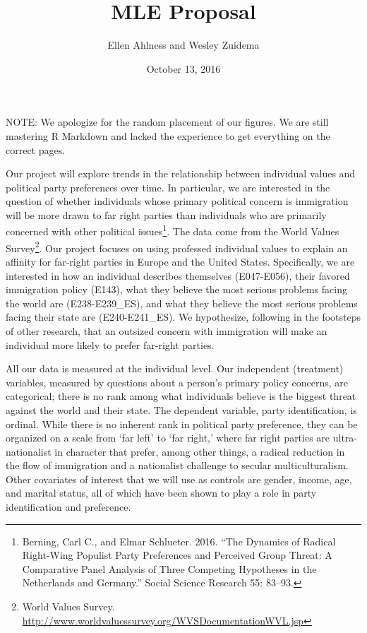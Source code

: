 \documentclass[11pt,]{article}
\title{MLE Proposal}
\author{Ellen Ahlness and Wesley Zuidema}
\date{October 13, 2016}
\let\rmarkdownfootnote\footnote%
\def\footnote{\protect\rmarkdownfootnote}
\begin{document}
\maketitle

NOTE: We apologize for the random placement of our figures. We are still
mastering R Markdown and lacked the experience to get everything on the
correct pages.

Our project will explore trends in the relationship between individual
values and political party preferences over time. In particular, we are
interested in the question of whether individuals whose primary
political concern is immigration will be more drawn to far right parties
than individuals who are primarily concerned with other political
issues\footnote{Berning, Carl C., and Elmar Schlueter. 2016. ``The
  Dynamics of Radical Right-Wing Populist Party Preferences and
  Perceived Group Threat: A Comparative Panel Analysis of Three
  Competing Hypotheses in the Netherlands and Germany.'' Social Science
  Research 55: 83--93.}. The data come from the World Values
Survey\footnote{World Values Survey.
  \url{http://www.worldvaluessurvey.org/WVSDocumentationWVL.jsp}}. Our
project focuses on using professed individual values to explain an
affinity for far-right parties in Europe and the United States.
Specifically, we are interested in how an individual describes
themselves (E047-E056), their favored immigration policy (E143), what
they believe the most serious problems facing the world are
(E238-E239\_ES), and what they believe the most serious problems facing
their state are (E240-E241\_ES). We hypothesize, following in the
footsteps of other research, that an outsized concern with immigration
will make an individual more likely to prefer far-right parties.

All our data is measured at the individual level. Our independent
(treatment) variables, measured by questions about a person's primary
policy concerns, are categorical; there is no rank among what
individuals believe is the biggest threat against the world and their
state. The dependent variable, party identification, is ordinal. While
there is no inherent rank in political party preference, they can be
organized on a scale from `far left' to `far right,' where far right
parties are ultra-nationalist in character that prefer, among other
things, a radical reduction in the flow of immigration and a nationalist
challenge to secular multiculturalism. Other covariates of interest that
we will use as controls are gender, income, age, and marital status, all
of which have been shown to play a role in party identification and
preference.
\end{document}
